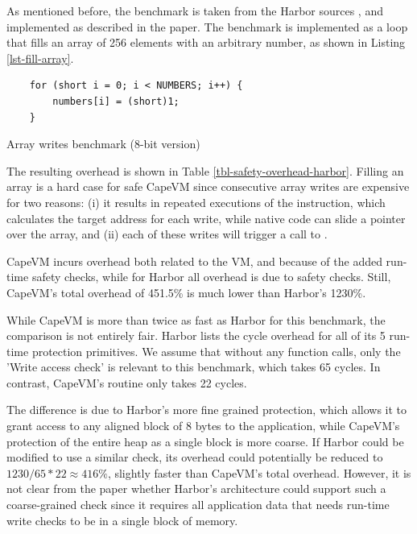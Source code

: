 As mentioned before, the  benchmark is taken from the Harbor sources \cite{sos-operating-system}, and  implemented as described in the paper. The  benchmark is implemented as a loop that fills an array of 256 elements with an arbitrary number, as shown in Listing \ref{lst-fill-array}.


\begin{listing}
\begin{verbatim}
    for (short i = 0; i < NUMBERS; i++) {
        numbers[i] = (short)1;
    }
\end{verbatim}
\caption{Array writes benchmark (8-bit version)}
\label{lst-fill-array}
\end{listing}




The resulting overhead is shown in Table \ref{tbl-safety-overhead-harbor}. Filling an array is a hard case for safe CapeVM since consecutive array writes are expensive for two reasons: (i) it results in repeated executions of the  instruction, which calculates the target address for each write, while native code can slide a pointer over the array, and (ii) each of these writes will trigger a call to .

CapeVM incurs overhead both related to the VM, and because of the added run-time safety checks, while for Harbor all overhead is due to safety checks. Still, CapeVM's total overhead of 451.5\% is much lower than Harbor's 1230\%.

While CapeVM is more than twice as fast as Harbor for this benchmark, the comparison is not entirely fair. Harbor lists the cycle overhead for all of its 5 run-time protection primitives. We assume that without any function calls, only the 'Write access check' is relevant to this benchmark, which takes 65 cycles. In contrast, CapeVM's  routine only takes 22 cycles.

The difference is due to Harbor's more fine grained protection, which allows it to grant access to any aligned block of 8 bytes to the application, while CapeVM's protection of the entire heap as a single block is more coarse. If Harbor could be modified to use a similar check, its overhead could potentially be reduced to $1230 / 65 * 22 \approx 416\%$, slightly faster than CapeVM's total overhead. However, it is not clear from the paper whether Harbor's architecture could support such a coarse-grained check since it requires all application data that needs run-time write checks to be in a single block of memory.

